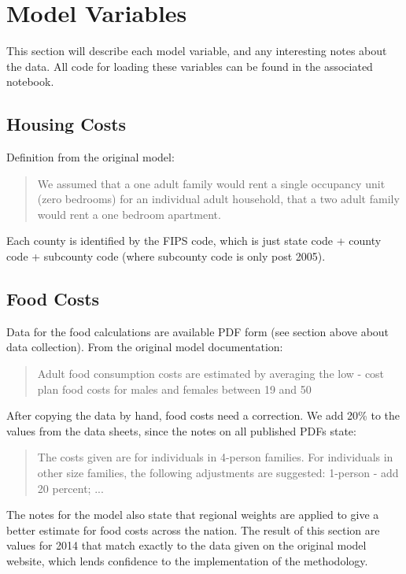 \chapter{Model Variables}\label{ch:model_variables}


This section will describe each model variable, and any interesting notes about the data. All code for loading these variables can be found in the associated notebook. \cite{code_model_variables}

\section{Housing Costs}

Definition from the original model:

\begin{quote}
We assumed that a one adult family would rent a single occupancy unit (zero bedrooms) for an individual adult household, that a two adult family would rent a one bedroom apartment.
\end{quote}

Each county is identified by the FIPS code, which is just state code + county code + subcounty code (where subcounty code is only post 2005).


\section{Food Costs}

Data for the food calculations are available PDF form (see section above about data collection). From the original model documentation:

\begin{quote}
Adult food consumption costs are estimated by averaging the low - cost plan food costs for males and females between 19 and 50
\end{quote}

After copying the data by hand, food costs need a correction. We add 20\% to the values from the data sheets, since the notes on all published PDFs state:

\begin{quote}
The costs given are for individuals in 4-person families. For individuals in other size families, the following adjustments are suggested: 1-person - add 20 percent; ...
\end{quote}

The notes for the model also state that regional weights are applied to give a better estimate for food costs across the nation. \cite{usda_regional} The result of this section are values for 2014 that match exactly to the data given on the original model website, which lends confidence to the implementation of the methodology.


